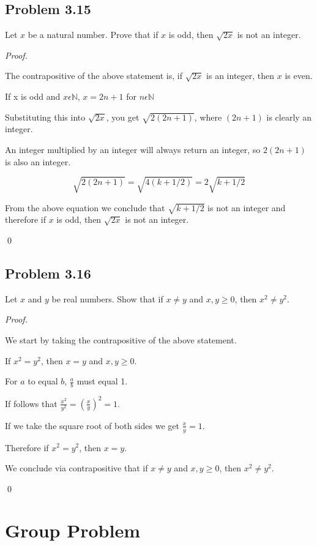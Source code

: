 \documentclass{article}
\begin{document}
\subsection{Problem 3.15}
Let $x$ be a natural number. Prove that if $x$ is odd, then $\sqrt{2x}$ is not an integer.

\textit{Proof.}
\begin{addmargin}[0.75cm]{0cm}
	
	The contrapositive of the above statement is, if $\sqrt{2x}$ is an integer, then $x$ is even.
	
	If x is odd and $x \epsilon \mathbb{N}$, $x = 2n+1$ for $n \epsilon \mathbb{N}$
	
	Substituting this into $\sqrt{2x}$, you get $\sqrt{2(2n+1)}$, where $(2n+1)$ is clearly an integer.
	
	An integer multiplied by an integer will always return an integer, so $2(2n + 1)$ is also an integer.
	
	\begin{equation}
		\sqrt{2(2n+1)} = \sqrt{4(k+1/2)} = 2 \sqrt{k+1/2}
	\end{equation}
	
	From the above equation we conclude that $\sqrt{k+1/2}$ is not an integer and therefore 
	if $x$ is odd, then $\sqrt{2x}$ is not an integer.
	
	\qed
\end{addmargin}

\pagebreak
\subsection{Problem 3.16}
Let $x$ and $y$ be real numbers. Show that if $x \neq y$ and $x,y \geq 0$, then $x^2 \neq y^2$.

\textit{Proof.}
\begin{addmargin}[0.75cm]{0cm}
	We start by taking the contrapositive of the above statement.
	
	If $x^2 = y^2$, then $x = y$ and $x,y \geq 0$.
	
	For $a$ to equal $b$, $\frac{a}{b}$ must equal 1.
	
	If follows that $\frac{x^2}{y^2}=(\frac{x}{y})^2=1$.
	
	If we take the square root of both sides we get $\frac{x}{y}=1$.
	
	Therefore if $x^2=y^2$, then $x=y$.
	
	We conclude via contrapositive that if $x \neq y$ and $x,y \geq 0$, then $x^2 \neq y^2$.
	
	\qed
\end{addmargin}


\pagebreak
\section{Group Problem}
\end{document}

